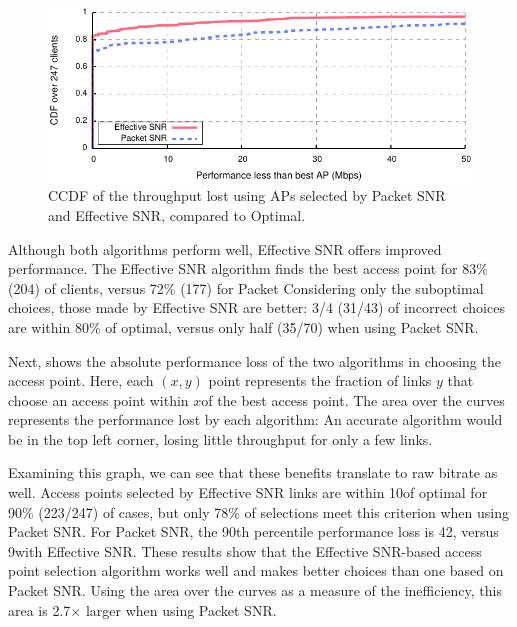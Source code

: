 \begin{figure}[t]
	\centering
	\includegraphics[width=\textwidth]{figures/applications/ap_sel_diff_opt.pdf}
	\caption[Throughput difference using APs selected by Packet SNR or Effective SNR]{\label{fig:ap_sel_delta_opt}CCDF of the throughput lost using APs selected by Packet SNR and Effective SNR, compared to Optimal.}
\end{figure}

Although both algorithms perform well, Effective SNR offers improved performance. The Effective SNR algorithm finds the best access point for 83\% (204) of clients, versus 72\% (177) for Packet Considering only the suboptimal choices, those made by Effective SNR are better: 3/4 (31/43) of incorrect choices are within 80\% of optimal, versus only half (35/70) when using Packet SNR.

Next,  shows the absolute performance loss of the two algorithms in choosing the access point. Here, each $(x,y)$ point represents the fraction of links $y$ that choose an access point within $x$\Mbps of the best access point. The area over the curves represents the performance lost by each algorithm: An accurate algorithm would be in the top left corner, losing little throughput for only a few links.

Examining this graph, we can see that these benefits translate to raw bitrate as well. Access points selected by Effective SNR links are within 10\Mbps of optimal for 90\% (223/247) of cases, but only 78\% of selections meet this criterion when using Packet SNR. For Packet SNR, the 90th percentile performance loss is 42\Mbps, versus 9\Mbps with Effective SNR. These results show that the Effective SNR-based access point selection algorithm works well and makes better choices than one based on Packet SNR. Using the area over the curves as a measure of the inefficiency, this area is 2.7$\times$ larger when using Packet SNR.

